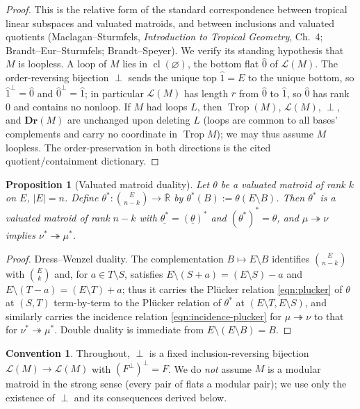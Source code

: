 \documentclass{article}
\newtheorem{proposition}[theorem]{Proposition}
\theoremstyle{definition}
\newtheorem{convention}[theorem]{Convention}
\newcommand{\Rbar}{\overline{\mathbb{R}}}
\newcommand{\cl}{\operatorname{cl}}
\newcommand{\Trop}{\operatorname{Trop}}
\newcommand{\onto}{\twoheadrightarrow}
\newcommand{\Dr}{\mathbf{Dr}}
\newcommand{\cLL}{\mathcal{L}}
\begin{document}
\begin{proof}
This is the relative form of the standard correspondence between tropical linear subspaces and
valuated matroids, and between inclusions and valuated quotients (Maclagan--Sturmfels,
\emph{Introduction to Tropical Geometry}, Ch.~4; Brandt--Eur--Sturmfels; Brandt--Speyer). We verify
its standing hypothesis that $M$ is loopless. A loop of $M$ lies in $\cl(\varnothing)$, the bottom
flat $\hat0$ of $\cLL(M)$. The order-reversing bijection $\perp$ sends the unique top
$\hat1=E$ to the unique bottom, so $\hat1^{\perp}=\hat0$ and $\hat0^{\perp}=\hat1$; in particular
$\cLL(M)$ has length $r$ from $\hat0$ to $\hat1$, so $\hat0$ has rank $0$ and contains no nonloop.
If $M$ had loops $L$, then $\Trop(M)$, $\cLL(M)$, $\perp$, and $\Dr(M)$ are unchanged upon deleting
$L$ (loops are common to all bases' complements and carry no coordinate in $\Trop M$); we may thus
assume $M$ loopless. The order-preservation in both directions is the cited quotient/containment
dictionary.
\end{proof}

\begin{proposition}[Valuated matroid duality]\label{fact:dual}
Let $\theta$ be a valuated matroid of rank $k$ on $E$, $|E|=n$. Define
$\theta^{*}\colon\binom{E}{n-k}\to\Rbar$ by $\theta^{*}(B):=\theta(E\setminus B)$. Then $\theta^{*}$
is a valuated matroid of rank $n-k$ with $\underline{\theta^{*}}=(\underline\theta)^{*}$ and
$(\theta^{*})^{*}=\theta$, and $\mu\onto\nu$ implies $\nu^{*}\onto\mu^{*}$.
\end{proposition}

\begin{proof}
Dress--Wenzel duality. The complementation $B\mapsto E\setminus B$ identifies $\binom{E}{n-k}$ with
$\binom{E}{k}$ and, for $a\in T\setminus S$, satisfies $E\setminus(S+a)=(E\setminus S)-a$ and
$E\setminus(T-a)=(E\setminus T)+a$; thus it carries the Pl\"ucker relation \eqref{eqn:plucker} of
$\theta$ at $(S,T)$ term-by-term to the Pl\"ucker relation of $\theta^{*}$ at $(E\setminus
T,E\setminus S)$, and similarly carries the incidence relation \eqref{eqn:incidence-plucker} for
$\mu\onto\nu$ to that for $\nu^{*}\onto\mu^{*}$. Double duality is immediate from $E\setminus
(E\setminus B)=B$.
\end{proof}

\begin{convention}\label{conv:perp}
Throughout, $\perp$ is a fixed inclusion-reversing bijection $\cLL(M)\to\cLL(M)$ with
$(F^{\perp})^{\perp}=F$. We do \emph{not} assume $M$ is a modular matroid in the strong sense (every
pair of flats a modular pair); we use only the existence of $\perp$ and its consequences derived
below.
\end{convention}
\end{document}
